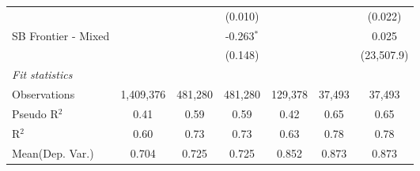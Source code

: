 \begin{tabular}{lcccccc}
                        &               &               & (0.010)       &               &               & (0.022)\\   
   SB Frontier - Mixed  &               &               & -0.263$^{*}$  &               &               & 0.025\\   
                        &               &               & (0.148)       &               &               & (23,507.9)\\   
   \midrule
   \emph{Fit statistics}\\
   Observations         & 1,409,376     & 481,280       & 481,280       & 129,378       & 37,493        & 37,493\\  
   Pseudo R$^2$         & 0.41          & 0.59          & 0.59          & 0.42          & 0.65          & 0.65\\  
   R$^2$                & 0.60          & 0.73          & 0.73          & 0.63          & 0.78          & 0.78\\  
Mean(Dep. Var.) & 0.704 & 0.725 & 0.725 & 0.852 & 0.873 & 0.873 \\
   

\end{tabular}
